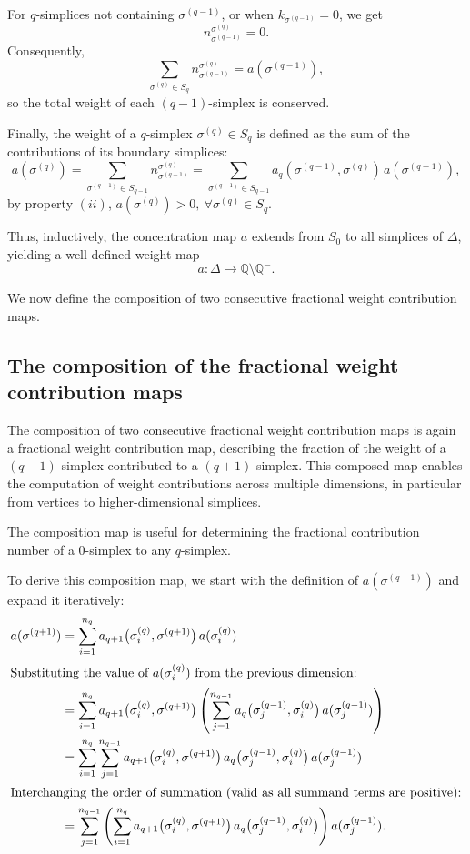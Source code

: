 \documentclass[12pt]{article}
\theoremstyle{normalhead_nobrackets}
\theoremstyle{exampstyle}
\begin{document}
For $q$-simplices not containing $\sigma^{(q-1)}$, or when 
$k_{\sigma^{(q-1)}} = 0$, we get
\[
n^{\sigma^{(q)}}_{\sigma^{(q-1)}} = 0.
\]
Consequently,
\[
\sum_{\sigma^{(q)} \in S_q}
n^{\sigma^{(q)}}_{\sigma^{(q-1)}}
=
a(\sigma^{(q-1)}),
\]
so the total weight of each $(q-1)$-simplex is conserved.

Finally, the weight of a $q$-simplex $\sigma^{(q)} \in S_q$ is defined as the sum of the contributions of its boundary simplices:
\[
a(\sigma^{(q)})
=
\sum_{\sigma^{(q-1)} \in S_{q-1}}
n^{\sigma^{(q)}}_{\sigma^{(q-1)}}
=
\sum_{\sigma^{(q-1)} \in S_{q-1}}
a_q(\sigma^{(q-1)}, \sigma^{(q)}) \, a(\sigma^{(q-1)}),
\]
by property $(ii)$, $a(\sigma^{(q)}) > 0, \ \forall \sigma^{(q)} \in S_q$.

Thus, inductively, the concentration map $a$ extends from $S_0$ to all simplices of $\Delta$, yielding a well-defined weight map
\[
a : \Delta \longrightarrow \mathbb{Q} \setminus \mathbb{Q}^-.
\]

We now define the composition of two consecutive fractional weight contribution maps.


\subsection{The composition of the fractional weight contribution maps}
The composition of two consecutive fractional weight contribution maps is again a fractional weight contribution map, describing the fraction of the weight of a $(q-1)$-simplex contributed to a $(q+1)$-simplex. This composed map enables the computation of weight contributions across multiple dimensions, in particular from vertices to higher-dimensional simplices.

The composition map is useful for determining the fractional contribution number of a $0$-simplex to any $q$-simplex.

To derive this composition map, we start with the definition of $a(\sigma^{(q+1)})$ and expand it iteratively:
\begin{align*}
a(\sigma^{(q+1)}) &=
\sum_{i=1}^{n_q}
a_{q+1}\bigl(\sigma_i^{(q)}, \sigma^{(q+1)}\bigr)
\, a(\sigma_i^{(q)}) \\
\intertext{Substituting the value of $a(\sigma_i^{(q)})$ from the previous dimension:}
&=
\sum_{i=1}^{n_q}
a_{q+1}\bigl(\sigma_i^{(q)}, \sigma^{(q+1)}\bigr)
\left(
\sum_{j=1}^{n_{q-1}}
a_q\bigl(\sigma_j^{(q-1)}, \sigma_i^{(q)}\bigr)
\, a(\sigma_j^{(q-1)})
\right) \\
&=
\sum_{i=1}^{n_q}
\sum_{j=1}^{n_{q-1}}
a_{q+1}\bigl(\sigma_i^{(q)}, \sigma^{(q+1)}\bigr)
\, a_q\bigl(\sigma_j^{(q-1)}, \sigma_i^{(q)}\bigr)
\, a(\sigma_j^{(q-1)}) \\
\intertext{Interchanging the order of summation (valid as all summand terms are positive):}
&=
\sum_{j=1}^{n_{q-1}}
\left(
\sum_{i=1}^{n_q}
a_{q+1}\bigl(\sigma_i^{(q)}, \sigma^{(q+1)}\bigr)
\, a_q\bigl(\sigma_j^{(q-1)}, \sigma_i^{(q)}\bigr)
\right)
a(\sigma_j^{(q-1)}).
\end{align*}
\end{document}
